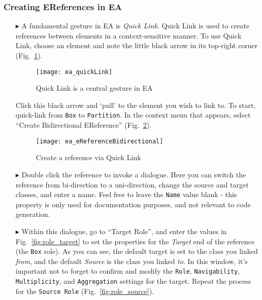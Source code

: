 \newpage
\subsubsection{Creating EReferences in EA}
\visHeader
\hypertarget{static:references vis}{}

\begin{itemize}

\item[$\blacktriangleright$] A fundamental gesture in EA is \emph{Quick Link}. Quick Link is used to create references between elements in a context-sensitive
manner. To use Quick Link, choose an element and note the little black arrow in its top-right corner (Fig.~\ref{fig:quicklink}).

\begin{figure}[htbp]
	\centering
  \texttt{[image: ea\_quickLink]}
	\caption{Quick Link is a central gesture in EA}
	\label{fig:quicklink}
\end{figure}
\FloatBarrier

Click this black arrow and `pull' to the element you wish to link to. To start, quick-link from \texttt{Box} to \texttt{Partition}. In the context menu
that appears, select ``Create Bidirectional EReference'' (Fig.~\ref{fig:ereference}).

\begin{figure}[htbp]
	\centering
  \texttt{[image: ea\_eReferenceBidirectional]}
	\caption{Create a reference via Quick Link}
	\label{fig:ereference}
\end{figure}
\FloatBarrier

\item[$\blacktriangleright$] Double click the reference to invoke a dialogue. Here you can switch the reference from bi-direction to a uni-direction, change the
source and target classes, and enter a name. Feel free to leave the \texttt{Name} value blank - this property is only used for documentation purposes, and not
relevant to code generation.

\item[$\blacktriangleright$] Within this dialogue, go to ``Target Role'', and enter the values in Fig.~\ref{fig:role_target} to set the properties for the
\emph{Target} end of the reference (the \texttt{Box} role). As you can see, the default target is set to the class you linked \emph{from}, and the default
\emph{Source} is the class you linked \emph{to}. In this window, it's important not to forget to confirm and modify the \texttt{Role}, \texttt{Navigability},
\texttt{Multiplicity}, and \texttt{Aggregation} settings for the target.  Repeat the process for the \texttt{Source Role} (Fig.~\ref{fig:role_source}).


\end{itemize}
